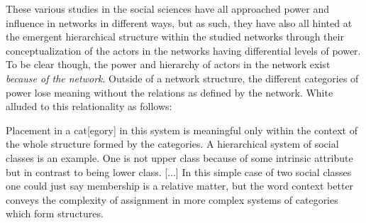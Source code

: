 \documentclass[3p,times]{elsarticle}
\begin{document}
These various studies in the social sciences have all approached power and influence in networks in different ways, but as such, they have also all hinted at the emergent hierarchical structure within the studied networks through their conceptualization of the actors in the networks having differential levels of power. To be clear though, the power and hierarchy of actors in the network exist \textit{because of the network}. Outside of a network structure, the different categories of power lose meaning without the relations as defined by the network. White alluded to this relationality as follows:
\begin{displayquote}
Placement in a cat[egory] in this system is meaningful only within the context of the whole structure formed by the categories. A hierarchical system of social classes is an example. One is not upper class because of some intrinsic attribute but in contrast to being lower class. [...] In this simple case of two social classes one could just say membership is a relative matter, but the word context better conveys the complexity of assignment in more complex systems of categories which form structures. \cite[p. 177]{white2007catnets}
\end{displayquote}
\end{document}

